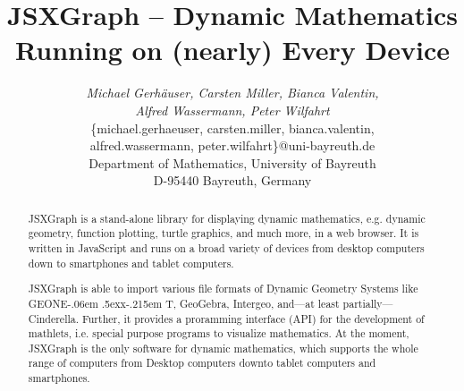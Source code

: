 \documentclass[12pt,a4paper]{article}%
\def\GEONExT{GEONE\kern-.06em \lower.5ex\hbox{x}\kern-.215em T}
\begin{document}
%
%
\title{JSXGraph -- Dynamic Mathematics Running on (nearly) Every Device}%
%
%
\author{\begin{tabular}{c}
\textit{Michael Gerh\"auser, Carsten Miller, Bianca Valentin,}\\
\textit{Alfred Wassermann, Peter Wilfahrt} \\
\{michael.gerhaeuser, carsten.miller, bianca.valentin, \\
alfred.wassermann, peter.wilfahrt\}@uni-bayreuth.de\\
Department of Mathematics, 
University of Bayreuth\\
D-95440 Bayreuth, 
Germany\end{tabular}
}%
%
\date{}                                                   %
\maketitle                                                %
%
%
\begin{abstract}
%
JSXGraph is a stand-alone library for displaying dynamic mathematics, e.g. dynamic geometry, 
function plotting, turtle graphics, and much more, in a web browser. 
It is written in JavaScript and runs on a broad variety of devices from 
desktop computers down to smartphones and tablet computers. 

JSXGraph is able to import various file formats of Dynamic Geometry Systems like \GEONExT{}, GeoGebra, Intergeo, 
and---at least partially---Cinderella. Further, it provides a proramming
interface (API) for the development of mathlets, i.e. special
purpose programs to visualize mathematics.
At the moment, JSXGraph is the only software for dynamic mathematics, which
supports the whole range of computers from Desktop computers
downto tablet computers and smartphones.
%
\end{abstract}%
%
\thispagestyle{fancy}                                     %
%
%
\end{document}
